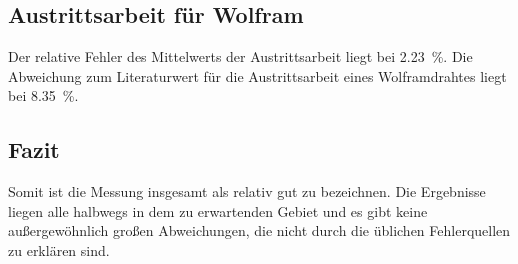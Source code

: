 \subsection{Austrittsarbeit für Wolfram}
Der relative Fehler des Mittelwerts der Austrittsarbeit liegt bei \SI{2.23}{\percent}. Die Abweichung zum Literaturwert für die Austrittsarbeit eines Wolframdrahtes liegt bei \SI{8.35}{\percent}. 

\subsection{Fazit}

Somit ist die Messung insgesamt als relativ gut zu bezeichnen. Die Ergebnisse liegen alle halbwegs in dem zu erwartenden Gebiet und es gibt keine außergewöhnlich großen Abweichungen, die nicht durch die üblichen Fehlerquellen zu erklären sind. %

